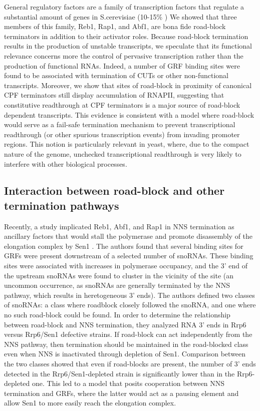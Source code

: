 General regulatory factors are a family of transcription factors that regulate a substantial amount of genes in S.cerevisiae (10-15\% \cite{rhee:2011:comprehensive}) 
We showed that three members of this family, Reb1, Rap1, and Abf1, are bona fide road-block terminators in addition to their activator roles. 
Because road-block termination results in the production of unstable transcripts, we speculate that its functional relevance concerns more the control of pervasive transcription rather than the production of functional RNAs. 
Indeed, a number of GRF binding sites were found to be associated with termination of CUTs or other non-functional transcripts. 
Moreover, we show that sites of road-block in proximity of canonical CPF terminators still display accumulation of RNAPII, suggesting that constitutive readthrough at CPF terminators is a major source of road-block dependent transcripts. 
This evidence is consistent with a model where road-block would serve as a fail-safe termination mechanism to prevent transcriptional readthrough (or other spurious transcription events) from invading promoter regions. 
This notion is particularly relevant in yeast, where, due to the compact nature of the genome, unchecked transcriptional readthrough is very likely to interfere with other biological processes.  

\subsection{Interaction between road-block and other termination pathways}

Recently, a study implicated Reb1, Abf1, and Rap1 in NNS termination as ancillary factors that would stall the polymerase and promote disassembly of the elongation complex by Sen1 \cite{roy:2016:common}.
The authors found that several binding sites for GRFs were present downstream of a selected number of snoRNAs. 
These binding sites were associated with increases in polymerase occupancy, and the 3’ end of the upstream snoRNAs were found to cluster in the vicinity of the site (an uncommon occurrence, as snoRNAs are generally terminated by the NNS pathway, which results in heretogeneous 3’ ends). 
The authors defined two classes of snoRNAs: a class where roadblock closely followed the snoRNA, and one where no such road-block could be found.
In order to determine the relationship between road-block and NNS termination, they analyzed RNA 3' ends in Rrp6 versus Rrp6/Sen1 defective strains.
If road-block can act independently from the NNS pathway, then termination should be maintained in the road-blocked class even when NNS is inactivated through depletion of Sen1.
Comparison between the two classes showed that even if road-blocks are present, the number of 3' ends detected in the Rrp6/Sen1-depleted strain is significantly lower than in the Rrp6-depleted one.
This led to a model that posits cooperation between NNS termination and GRFs, where the latter would act as a pausing element and allow Sen1 to more easily reach the elongation complex.

